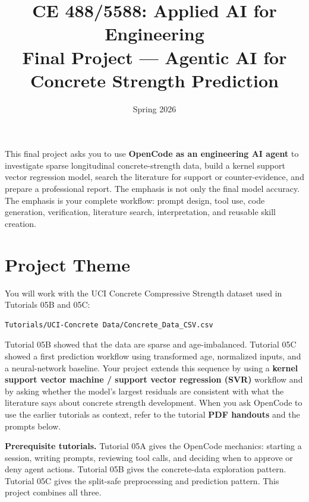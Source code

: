 \documentclass[12pt]{article}
\begin{document}
\title{CE 488/5588: Applied AI for Engineering \\
Final Project --- Agentic AI for Concrete Strength Prediction}
\author{}
\date{Spring 2026}

\maketitle

\begin{center}
\end{center}

\newpage 

\begin{ch-box}
This final project asks you to use \textbf{OpenCode as an engineering AI agent} to investigate sparse longitudinal concrete-strength data, build a kernel support vector regression model, search the literature for support or counter-evidence, and prepare a professional report.  The emphasis is not only the final model accuracy.  The emphasis is your complete workflow: prompt design, tool use, code generation, verification, literature search, interpretation, and reusable skill creation.
\end{ch-box}

\section*{Project Theme}

You will work with the UCI Concrete Compressive Strength dataset used in Tutorials 05B and 05C:

\begin{lstlisting}[style=term]
Tutorials/UCI-Concrete Data/Concrete_Data_CSV.csv
\end{lstlisting}

Tutorial 05B showed that the data are sparse and age-imbalanced.  Tutorial 05C showed a first prediction workflow using transformed age, normalized inputs, and a neural-network baseline.  Your project extends this sequence by using a \textbf{kernel support vector machine / support vector regression (SVR)} workflow and by asking whether the model's largest residuals are consistent with what the literature says about concrete strength development.  When you ask OpenCode to use the earlier tutorials as context, refer to the tutorial \textbf{PDF handouts} and the prompts below.

\begin{def-box}
\textbf{Prerequisite tutorials.}  Tutorial 05A gives the OpenCode mechanics: starting a session, writing prompts, reviewing tool calls, and deciding when to approve or deny agent actions.  Tutorial 05B gives the concrete-data exploration pattern.  Tutorial 05C gives the split-safe preprocessing and prediction pattern.  This project combines all three.
\end{def-box}
\end{document}
